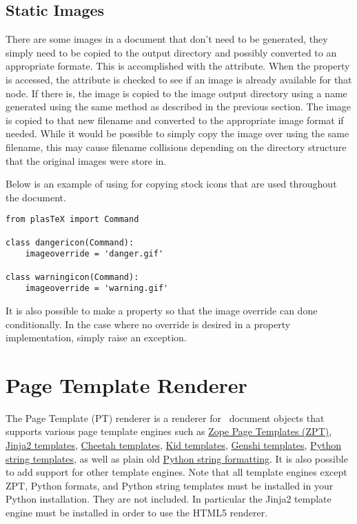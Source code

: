 \subsection{Static Images}

There are some images in a document that don't need to be generated, they
simply need to be copied to the output directory and possibly converted
to an appropriate formate.  This is accomplished with the
 attribute.  When the  property
is accessed, the  attribute is checked to see if
an image is already available for that node.  If there is, the image
is copied to the image output directory using a name generated
using the same method as described in the previous section.  The image
is copied to that new filename and converted to the appropriate
image format if needed.  While it would be possible to simply copy the
image over using the same filename, this may cause filename collisions
depending on the directory structure that the original images were
store in.

Below is an example of using  for copying
stock icons that are used throughout the document.
\begin{verbatim}
from plasTeX import Command

class dangericon(Command):
    imageoverride = 'danger.gif'

class warningicon(Command):
    imageoverride = 'warning.gif'
\end{verbatim}

It is also possible to make  a property
so that the image override can done conditionally.  In the case
where no override is desired in a property implementation, simply
raise an  exception.

\section{Page Template Renderer\label{sec:zpt}}

The Page Template (PT) renderer is a renderer for \plasTeX\ document
objects that supports various page template engines such as
\href{http://www.zope.org/Documentation/Books/ZopeBook/2_6Edition/ZPT.stx}{Zope
Page Templates (ZPT)}, \href{http://jinja.pocoo.org/}{Jinja2 templates},
\href{http://www.cheetahtemplate.org/}{Cheetah templates},
\href{http://kid-templating.org/}{Kid templates},
\href{http://genshi.edgewall.org/}{Genshi templates},
\href{http://docs.python.org/lib/node40.html}{Python string templates},
as well as plain old \href{http://docs.python.org/lib/typesseq-strings.html}{Python string formatting}.  It is also possible to add support for other
template engines.  Note that all template engines except ZPT, Python formats,
and Python string templates must be installed in your Python installation.
They are not included. In particular the Jinja2 template engine must be
installed in order to use the HTML5 renderer.

